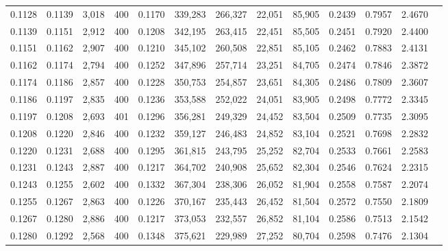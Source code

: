 \begin{tabular}{rrrrrrrrrrrrr}
0.1128 & 0.1139 &  3,018 & 400 &                                     0.1170 & 339,283 & 266,327 &  22,051 &  85,905 & 0.2439 & 0.7957 & 2.4670 \\
0.1139 & 0.1151 &  2,912 & 400 &                                     0.1208 & 342,195 & 263,415 &  22,451 &  85,505 & 0.2451 & 0.7920 & 2.4400 \\
0.1151 & 0.1162 &  2,907 & 400 &                                     0.1210 & 345,102 & 260,508 &  22,851 &  85,105 & 0.2462 & 0.7883 & 2.4131 \\
0.1162 & 0.1174 &  2,794 & 400 &                                     0.1252 & 347,896 & 257,714 &  23,251 &  84,705 & 0.2474 & 0.7846 & 2.3872 \\
0.1174 & 0.1186 &  2,857 & 400 &                                     0.1228 & 350,753 & 254,857 &  23,651 &  84,305 & 0.2486 & 0.7809 & 2.3607 \\
0.1186 & 0.1197 &  2,835 & 400 &                                     0.1236 & 353,588 & 252,022 &  24,051 &  83,905 & 0.2498 & 0.7772 & 2.3345 \\
0.1197 & 0.1208 &  2,693 & 401 &                                     0.1296 & 356,281 & 249,329 &  24,452 &  83,504 & 0.2509 & 0.7735 & 2.3095 \\
0.1208 & 0.1220 &  2,846 & 400 &                                     0.1232 & 359,127 & 246,483 &  24,852 &  83,104 & 0.2521 & 0.7698 & 2.2832 \\
0.1220 & 0.1231 &  2,688 & 400 &                                     0.1295 & 361,815 & 243,795 &  25,252 &  82,704 & 0.2533 & 0.7661 & 2.2583 \\
0.1231 & 0.1243 &  2,887 & 400 &                                     0.1217 & 364,702 & 240,908 &  25,652 &  82,304 & 0.2546 & 0.7624 & 2.2315 \\
0.1243 & 0.1255 &  2,602 & 400 &                                     0.1332 & 367,304 & 238,306 &  26,052 &  81,904 & 0.2558 & 0.7587 & 2.2074 \\
0.1255 & 0.1267 &  2,863 & 400 &                                     0.1226 & 370,167 & 235,443 &  26,452 &  81,504 & 0.2572 & 0.7550 & 2.1809 \\
0.1267 & 0.1280 &  2,886 & 400 &                                     0.1217 & 373,053 & 232,557 &  26,852 &  81,104 & 0.2586 & 0.7513 & 2.1542 \\
0.1280 & 0.1292 &  2,568 & 400 &                                     0.1348 & 375,621 & 229,989 &  27,252 &  80,704 & 0.2598 & 0.7476 & 2.1304 \\

\end{tabular}
